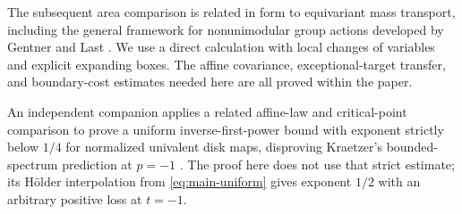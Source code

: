 The subsequent area comparison is related in form to equivariant
mass transport, including the general framework for nonunimodular
group actions developed by Gentner and Last \cite{GentnerLast2011}.
We use a direct calculation with local changes of variables and
explicit expanding boxes. The affine covariance, exceptional-target
transfer, and boundary-cost estimates needed here are all proved
within the paper.

An independent companion applies a related affine-law and critical-point
comparison to prove a uniform inverse-first-power bound with exponent
strictly below $1/4$ for normalized univalent disk maps, disproving
Kraetzer's bounded-spectrum prediction at $p=-1$
\cite[Theorem~1.1]{OpenAIStrictInverseFirst2026}.
The proof here does not use that strict estimate; its H\"older
interpolation from \eqref{eq:main-uniform} gives exponent $1/2$ with
an arbitrary positive loss at $t=-1$.
